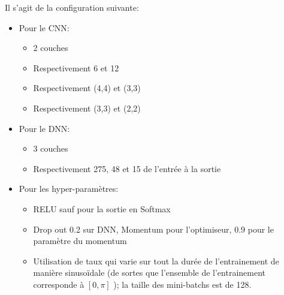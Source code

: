 \documentclass[12pt,a4paper]{extarticle}
\begin{document}
Il s'agit de la configuration suivante:
\begin{itemize}
\item Pour le CNN:
	\begin{itemize}
	\item 2 couches
	\item Respectivement 6 et 12
	\item Respectivement (4,4) et (3,3)
	\item Respectivement (3,3) et (2,2)

	\end{itemize}
\item Pour le DNN:
	\begin{itemize}
	\item 3 couches
	\item Respectivement 275, 48 et 15 de l'entrée à la sortie 
	\end{itemize}
\item Pour les hyper-paramètres:
	\begin{itemize}
	\item RELU sauf pour la sortie en Softmax
	\item Drop out 0.2 sur DNN, Momentum pour l'optimiseur, 0.9 pour le paramètre du momentum
	\item Utilisation de taux qui varie sur tout la durée de l'entrainement de manière sinusoïdale (de sortes que l'ensemble de l'entrainement corresponde à $ [0 ,\pi ]$ ); la taille des mini-batchs est de 128.
	\end{itemize}
\end{itemize}
\end{document}
